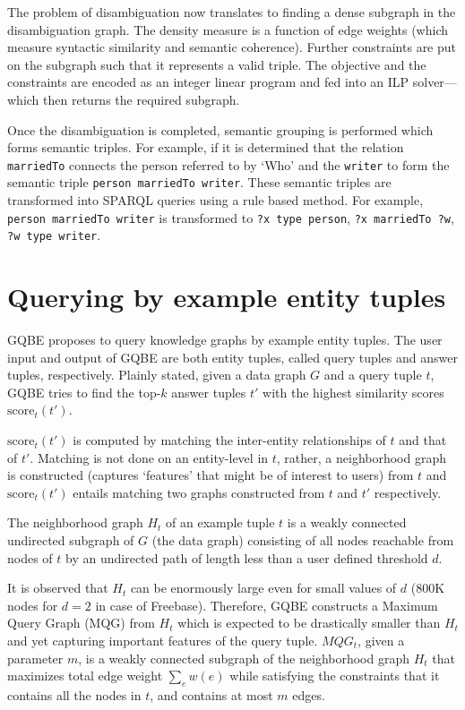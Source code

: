 \documentclass[a4paper, twoside, 12pt]{report}
\begin{document}
The problem of disambiguation now translates to finding a dense subgraph in the disambiguation graph. The density measure is a function of edge weights (which measure syntactic similarity and semantic coherence). Further constraints are put on the subgraph such that it represents a valid triple. The objective and the constraints are encoded as an integer linear program and fed into an ILP solver---which then returns the required subgraph.

Once the disambiguation is completed, semantic grouping is performed which forms semantic triples. For example, if it is determined that the relation \texttt{marriedTo} connects the person referred to by `Who' and the \texttt{writer} to form the semantic triple \texttt{person marriedTo writer}. These semantic triples are transformed into SPARQL queries using a rule based method. For example, \texttt{person marriedTo writer} is transformed to \texttt{?x type person}, \texttt{?x marriedTo ?w}, \texttt{?w type writer}.


\section{Querying by example entity tuples}


 GQBE \cite{jayaram2013querying} proposes to query knowledge graphs by example entity tuples. The user input and output of GQBE are both entity tuples,
called query tuples and answer tuples, respectively. Plainly stated, given a data graph $G$ and a query tuple $t$, GQBE tries to find the top-$k$ answer tuples $t'$ with the highest similarity scores $\text{score}_t(t')$.
 
 
 $\text{score}_t(t')$ is computed by matching the inter-entity relationships of $t$ and that of $t'$. Matching is not done on an entity-level in $t$, rather, a neighborhood graph is constructed (captures `features' that might be of interest to users) from $t$ and $\text{score}_t(t')$ entails matching two
 graphs constructed from $t$ and $t'$ respectively.
 
 The neighborhood graph $H_t$ of an example tuple $t$ is a weakly connected undirected subgraph of $G$ (the data graph) consisting of all nodes reachable from nodes of $t$ by an undirected path of length less than a user defined threshold $d$.
 
 It is observed that $H_t$ can be enormously large even for small values of $d$ (800K nodes for $d = 2$ in case of Freebase). Therefore, GQBE constructs a Maximum Query Graph (MQG) from $H_t$ which is expected to be drastically smaller than $H_t$ and yet capturing important features of the query tuple. $MQG_t$, given
 a parameter $m$, is a weakly connected subgraph of the  neighborhood graph $H_t$ that maximizes total edge weight
 $\sum_e w(e)$ while satisfying the constraints that it contains all the nodes in $t$, and contains at most $m$ edges.
 
\end{document}

